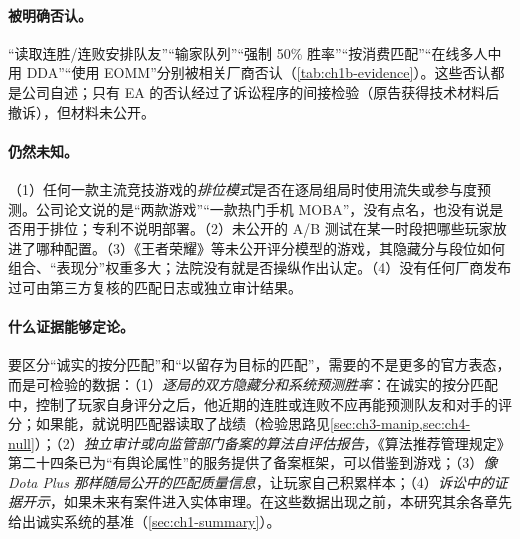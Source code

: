 \paragraph{被明确否认。}
“读取连胜/连败安排队友”“输家队列”“强制 50\% 胜率”“按消费匹配”“在线多人中用 DDA”“使用 EOMM”分别被相关厂商否认（\cref{tab:ch1b-evidence}）\tagOff。这些否认都是公司自述；只有 EA 的否认经过了诉讼程序的间接检验（原告获得技术材料后撤诉），但材料未公开。

\paragraph{仍然未知。}
（1）任何一款主流竞技游戏的\emph{排位模式}是否在逐局组局时使用流失或参与度预测。公司论文说的是“两款游戏”“一款热门手机 MOBA”，没有点名，也没有说是否用于排位；专利不说明部署。（2）未公开的 A/B 测试在某一时段把哪些玩家放进了哪种配置。（3）《王者荣耀》等未公开评分模型的游戏，其隐藏分与段位如何组合、“表现分”权重多大；法院没有就是否操纵作出认定。（4）没有任何厂商发布过可由第三方复核的匹配日志或独立审计结果。

\paragraph{什么证据能够定论。}
要区分“诚实的按分匹配”和“以留存为目标的匹配”，需要的不是更多的官方表态，而是可检验的数据：（1）\emph{逐局的双方隐藏分和系统预测胜率}：在诚实的按分匹配中，控制了玩家自身评分之后，他近期的连胜或连败不应再能预测队友和对手的评分；如果能，就说明匹配器读取了战绩（检验思路见\cref{sec:ch3-manip,sec:ch4-null}）；（2）\emph{独立审计或向监管部门备案的算法自评估报告}，《算法推荐管理规定》第二十四条已为“有舆论属性”的服务提供了备案框架，可以借鉴到游戏；（3）\emph{像 Dota Plus 那样随局公开的匹配质量信息}，让玩家自己积累样本；（4）\emph{诉讼中的证据开示}，如果未来有案件进入实体审理。在这些数据出现之前，本研究其余各章先给出诚实系统的基准（\cref{sec:ch1-summary}）。

